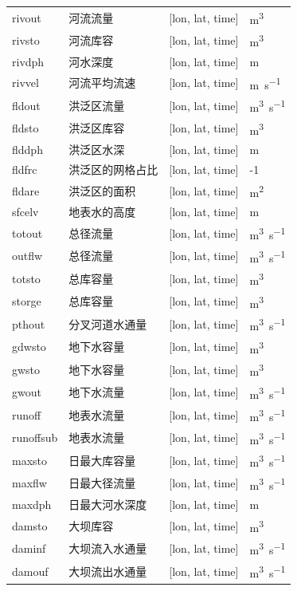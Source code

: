 \documentclass[a4paper,12pt,twoside]{article}
\begin{document}
\begin{table}[htbp]
\begin{tabular}{lp{}ll}
rivout & 河流流量 & {[}lon, lat, time{]}  & \unit{m^3} \\
rivsto & 河流库容 & {[}lon, lat, time{]}  & \unit{m^3} \\
rivdph & 河水深度 & {[}lon, lat, time{]}  & \unit{m} \\
rivvel & 河流平均流速 & {[}lon, lat, time{]}  & \unit{m.s^{-1}} \\
fldout & 洪泛区流量 & {[}lon, lat, time{]}  & \unit{m^3.s^{-1}} \\
fldsto & 洪泛区库容 & {[}lon, lat, time{]}  & \unit{m^3} \\
flddph & 洪泛区水深 & {[}lon, lat, time{]}  & \unit{m} \\ %
fldfrc & 洪泛区的网格占比 & {[}lon, lat, time{]}  & \textquotesingle0-1\textquotesingle{} \\
fldare & 洪泛区的面积 & {[}lon, lat, time{]}  & \unit{m^2} \\
sfcelv & 地表水的高度 & {[}lon, lat, time{]}  & \unit{m} \\
totout & 总径流量 & {[}lon, lat, time{]}  & \unit{m^3.s^{-1}} \\
outflw & 总径流量 & {[}lon, lat, time{]}  & \unit{m^3.s^{-1}} \\
totsto & 总库容量 & {[}lon, lat, time{]}  & \unit{m^3} \\
storge & 总库容量 & {[}lon, lat, time{]}  & \unit{m^3} \\
pthout & 分叉河道水通量 & {[}lon, lat, time{]}  & \unit{m^3.s^{-1}} \\
gdwsto & 地下水容量 & {[}lon, lat, time{]}  & \unit{m^3} \\
gwsto & 地下水容量 & {[}lon, lat, time{]}  & \unit{m^3} \\
gwout & 地下水流量 & {[}lon, lat, time{]}  & \unit{m^3.s^{-1}} \\
runoff & 地表水流量 & {[}lon, lat, time{]}  & \unit{m^3.s^{-1}} \\
runoffsub & 地表水流量 & {[}lon, lat, time{]}  & \unit{m^3.s^{-1}} \\
maxsto & 日最大库容量 & {[}lon, lat, time{]}  & \unit{m^3.s^{-1}} \\
maxflw & 日最大径流量 & {[}lon, lat, time{]}  & \unit{m^3.s^{-1}} \\
maxdph & 日最大河水深度 & {[}lon, lat, time{]}  & \unit{m} \\
damsto & 大坝库容 & {[}lon, lat, time{]}  & \unit{m^3} \\
daminf & 大坝流入水通量 & {[}lon, lat, time{]}  & \unit{m^3.s^{-1}} \\
damouf & 大坝流出水通量 & {[}lon, lat, time{]}  & \unit{m^3.s^{-1}} \\
\bottomrule
\end{tabular}
\end{table}
\end{document}
